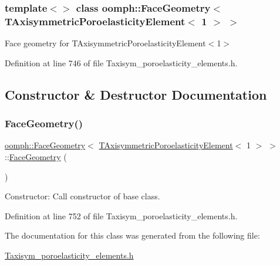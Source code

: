 \subsubsection*{template$<$$>$\newline
class oomph\+::\+Face\+Geometry$<$ T\+Axisymmetric\+Poroelasticity\+Element$<$ 1 $>$ $>$}

Face geometry for T\+Axisymmetric\+Poroelasticity\+Element$<$1$>$ 

Definition at line 746 of file Taxisym\+\_\+poroelasticity\+\_\+elements.\+h.



\subsection{Constructor \& Destructor Documentation}
\mbox{\label{classoomph_1_1FaceGeometry_3_01TAxisymmetricPoroelasticityElement_3_011_01_4_01_4_a22a8c74da05d35900496807374b292ad}} 
\subsubsection{\texorpdfstring{Face\+Geometry()}{FaceGeometry()}}
{\footnotesize\ttfamily \hyperlink{classoomph_1_1FaceGeometry}{oomph\+::\+Face\+Geometry}$<$ \hyperlink{classoomph_1_1TAxisymmetricPoroelasticityElement}{T\+Axisymmetric\+Poroelasticity\+Element}$<$ 1 $>$ $>$\+::\hyperlink{classoomph_1_1FaceGeometry}{Face\+Geometry} (\begin{DoxyParamCaption}{ }\end{DoxyParamCaption})\hspace{0.3cm}{\ttfamily [inline]}}



Constructor\+: Call constructor of base class. 



Definition at line 752 of file Taxisym\+\_\+poroelasticity\+\_\+elements.\+h.



The documentation for this class was generated from the following file\+:\begin{DoxyCompactItemize}
\item 
\hyperlink{Taxisym__poroelasticity__elements_8h}{Taxisym\+\_\+poroelasticity\+\_\+elements.\+h}\end{DoxyCompactItemize}
